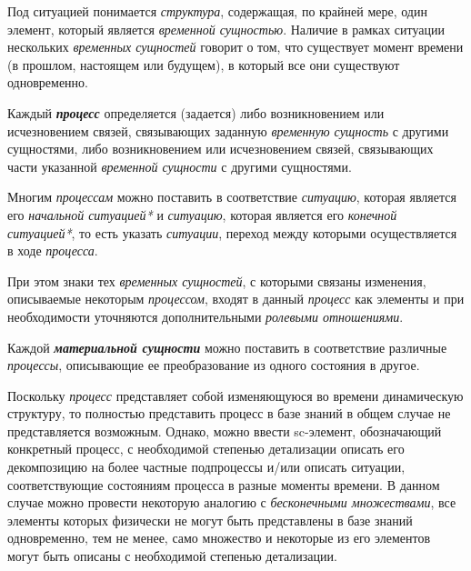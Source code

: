 Под ситуацией понимается \textit{структура}, содержащая, по крайней мере, один элемент, который является \textit{временной сущностью}. Наличие в рамках ситуации нескольких \textit{временных сущностей} говорит о том, что существует момент времени (в прошлом, настоящем или будущем), в который все они существуют одновременно.

\begin{SCn}
\end{SCn}

Каждый \textbf{\textit{процесс}} определяется (задается) либо возникновением или исчезновением связей, связывающих заданную \textit{временную сущность} с другими сущностями, либо возникновением или исчезновением связей, связывающих части указанной \textit{временной сущности} с другими сущностями. 
			
Многим \textit{процессам} можно поставить в соответствие \textit{ситуацию}, которая является его \textit{начальной ситуацией*} и \textit{ситуацию}, которая является его \textit{конечной ситуацией*}, то есть указать \textit{ситуации}, переход между которыми осуществляется в ходе \textit{процесса}.
			
При этом знаки тех \textit{временных сущностей}, с которыми связаны изменения, описываемые некоторым \textit{процессом}, входят в данный \textit{процесс} как элементы и при необходимости уточняются дополнительными \textit{ролевыми отношениями}.

\begin{SCn}
\begin{scnsubdividing}
\end{scnsubdividing}
\end{SCn}

Каждой \textbf{\textit{материальной сущности}} можно поставить в соответствие различные \textit{процессы}, описывающие ее преобразование из одного состояния в другое.

Поскольку \textit{процесс} представляет собой изменяющуюся во времени динамическую структуру, то полностью представить процесс в базе знаний в общем случае не представляется возможным.
Однако, можно ввести sc-элемент, обозначающий конкретный процесс, с необходимой степенью детализации описать его декомпозицию на более частные подпроцессы и/или описать ситуации, соответствующие состояниям процесса в разные моменты времени.
В данном случае можно провести некоторую аналогию с \textit{бесконечными множествами}, все элементы которых физически не могут быть представлены в базе знаний одновременно, тем не менее, само множество и некоторые из его элементов могут быть описаны с необходимой степенью детализации.
	
